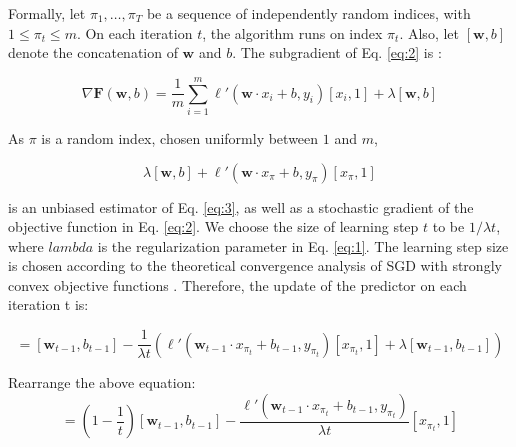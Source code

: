 \noindent Formally, let \( \pi_1, \dots, \pi_T \) be a sequence of independently random indices, with \( 1 \leq \pi_t \leq m \). On each iteration \( t\), the algorithm runs on index \(\pi_t\). Also, let \([\mathbf{w}, b] \) denote the concatenation of \(\mathbf{w}\) and \(b\). The subgradient of Eq. \eqref{eq:2} is :

\begin{displaymath}
\nabla \mathbf{F} (\mathbf{w}, b) = \frac{1}{m} \sum_{i=1}^{m} \ell' (\mathbf{w} \cdot x_i + b, y_i) [x_i, 1] + \lambda [\mathbf{w}, b] \tag{3} \label{eq:3}
\end{displaymath}

\noindent As \(\pi\) is a random index, chosen uniformly between \(1\) and \(m\), 

\begin{displaymath}
\lambda [\mathbf{w}, b] + \ell' (\mathbf{w} \cdot x_\pi + b, y_\pi) [x_\pi, 1]
\end{displaymath}

\noindent is an unbiased estimator of Eq. \eqref{eq:3}, as well as a stochastic gradient of the objective function in Eq. \eqref{eq:2}. We choose the size of learning step \(t \) to be \( 1/\lambda t\), where  \(lambda\) is the regularization parameter in Eq. \eqref{eq:1}. The learning step size is chosen according to the theoretical convergence analysis of SGD with strongly convex objective functions \cite{hazan2007logarithmic}. Therefore, the update of the predictor on each iteration t is:

\begin{displaymath}
[\mathbf{w}_t, b_t] = [\mathbf{w}_{t-1},b_{t-1}] - \frac{1}{\lambda t} \left(\ell' (\mathbf{w}_{t-1} \cdot x_{\pi_t} + b_{t-1}, y_{\pi_t}) [x_{\pi_t},1] + \lambda [\mathbf{w}_{t-1}, b_{t-1}]\right) 
\end{displaymath}

\noindent Rearrange the above equation:
\begin{displaymath}
[\mathbf{w}_t, b_t] = \left(1 - \frac{1}{t}\right) \left[\mathbf{w}_{t-1}, b_{t-1}\right] - \frac{\ell' (\mathbf{w}_{t-1} \cdot x_{\pi_t} + b_{t-1}, y_{\pi_t})}{\lambda t} [x_{\pi_t}, 1] \tag{4} \label{eq:4}
\end{displaymath}

